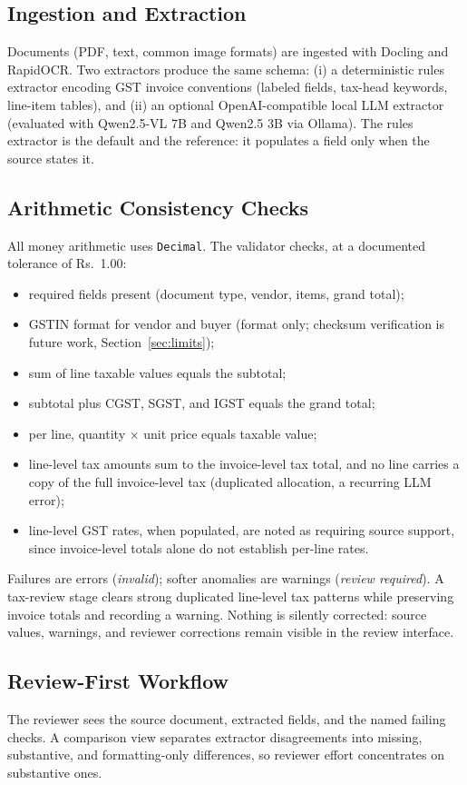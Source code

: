\documentclass[conference]{IEEEtran}
\begin{document}
\subsection{Ingestion and Extraction}
Documents (PDF, text, common image formats) are ingested with Docling and RapidOCR. Two extractors produce the same schema: (i) a deterministic rules extractor encoding GST invoice conventions (labeled fields, tax-head keywords, line-item tables), and (ii) an optional OpenAI-compatible local LLM extractor (evaluated with Qwen2.5-VL 7B and Qwen2.5 3B via Ollama). The rules extractor is the default and the reference: it populates a field only when the source states it.

\subsection{Arithmetic Consistency Checks}
All money arithmetic uses \texttt{Decimal}. The validator checks, at a documented tolerance of Rs.~1.00:
\begin{itemize}
\item required fields present (document type, vendor, items, grand total);
\item GSTIN format for vendor and buyer (format only; checksum verification is future work, Section~\ref{sec:limits});
\item sum of line taxable values equals the subtotal;
\item subtotal plus CGST, SGST, and IGST equals the grand total;
\item per line, quantity $\times$ unit price equals taxable value;
\item line-level tax amounts sum to the invoice-level tax total, and no line carries a copy of the full invoice-level tax (duplicated allocation, a recurring LLM error);
\item line-level GST rates, when populated, are noted as requiring source support, since invoice-level totals alone do not establish per-line rates.
\end{itemize}
Failures are errors (\emph{invalid}); softer anomalies are warnings (\emph{review required}). A tax-review stage clears strong duplicated line-level tax patterns while preserving invoice totals and recording a warning. Nothing is silently corrected: source values, warnings, and reviewer corrections remain visible in the review interface.

\subsection{Review-First Workflow}
The reviewer sees the source document, extracted fields, and the named failing checks. A comparison view separates extractor disagreements into missing, substantive, and formatting-only differences, so reviewer effort concentrates on substantive ones.
\end{document}
